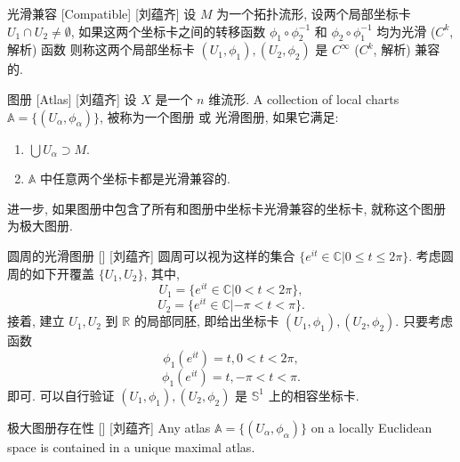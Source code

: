 \documentclass[UTF8]{ctexart}
\begin{document}
        \begin{dfn}
            []
            {光滑兼容}
            [Compatible]
            [刘蕴齐]
            设 \(M\) 为一个拓扑流形,
            设两个局部坐标卡 \( U_1 \cap U_2 \neq \emptyset \),
            如果这两个坐标卡之间的转移函数
             \( \phi_1 \circ \phi_2^{-1} \) 和
             \( \phi_2 \circ \phi_1^{-1} \) 
            均为光滑 (\(C^k\), 解析) 函数
            则称这两个局部坐标卡 \( (U_1, \phi_1), (U_2, \phi_2) \)  是 \(C^{\infty}\)  (\(C^k\), 解析) 兼容的. 
        \end{dfn}

        \begin{dfn}
            [Atlas]
            {图册}
            [Atlas]
            [刘蕴齐]
            设  \(X\)  是一个  \(n\)  维流形.  
            A collection of local charts 
             \(\mathbb{A} = \{(U_{\alpha},\phi_{\alpha})\}\),
            被称为一个图册 或 光滑图册, 
            如果它满足:
            \begin{enumerate}
                \item  \(\bigcup U_{\alpha} \supset M\). 
                \item  \(\mathbb{A}\) 中任意两个坐标卡都是光滑兼容的. 
            \end{enumerate}
            进一步, 如果图册中包含了所有和图册中坐标卡光滑兼容的坐标卡, 就称这个图册为极大图册. 
        \end{dfn}

        \begin{xmp}
            []
            {圆周的光滑图册}
            []
            [刘蕴齐]
            圆周可以视为这样的集合 \(\{ e^{it} \in \mathbb{C} | 0 \leq t \leq 2 \pi \}\). 
            考虑圆周的如下开覆盖 \(\{U_1, U_2\}\), 其中, 
            \[
            U_1 = \{ e^{it} \in \mathbb{C} | 0 < t < 2 \pi \},
            \]
            \[
            U_2 = \{ e^{it} \in \mathbb{C} | -\pi < t < \pi \}.
            \]
            接着, 建立 \(U_1, U_2\) 到 \(\mathbb{R}\) 的局部同胚, 即给出坐标卡 \((U_1,\phi_1), (U_2, \phi_2)\). 只要考虑函数
            \[
            \phi_1(e^{it}) = t, 0 < t < 2 \pi,
            \]
            \[
            \phi_1(e^{it}) = t, -\pi < t < \pi.
            \]
            即可. 可以自行验证 \((U_1,\phi_1), (U_2, \phi_2)\) 是 \(\mathbb{S}^1\) 上的相容坐标卡. 
            
        \end{xmp}
        
        \begin{ppt}
            []
            {极大图册存在性}
            []
            [刘蕴齐]
            Any atlas  \(\mathbb{A} = \{(U_{\alpha},\phi_{\alpha})\}\)  on a locally Euclidean space is contained in a unique maximal atlas.
        \end{ppt}
        
\end{document}
